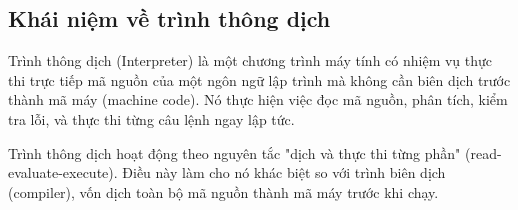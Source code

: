 \subsection{Khái niệm về trình thông dịch}
Trình thông dịch (Interpreter) là một chương trình máy tính có nhiệm vụ thực thi trực tiếp mã nguồn của một ngôn ngữ lập trình mà không cần biên dịch trước thành mã máy (machine code). Nó thực hiện việc đọc mã nguồn, phân tích, kiểm tra lỗi, và thực thi từng câu lệnh ngay lập tức.

Trình thông dịch hoạt động theo nguyên tắc "dịch và thực thi từng phần" (read-evaluate-execute). Điều này làm cho nó khác biệt so với trình biên dịch (compiler), vốn dịch toàn bộ mã nguồn thành mã máy trước khi chạy.